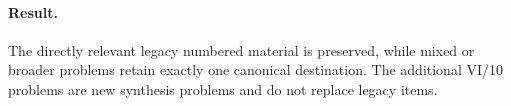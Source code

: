 \paragraph{Result.}
The directly relevant legacy numbered material is preserved, while mixed or broader problems
retain exactly one canonical destination.  The additional VI/10 problems are new synthesis
problems and do not replace legacy items.
